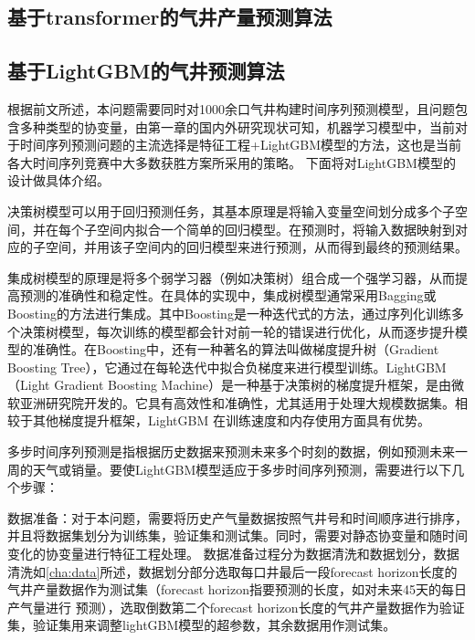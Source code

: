 \subsection{基于transformer的气井产量预测算法}
\subsection{基于LightGBM的气井预测算法}
根据前文所述，本问题需要同时对1000余口气井构建时间序列预测模型，且问题包含多种类型的协变量，由第一章的国内外研究现状可知，机器学习模型中，当前对于时间序列预测问题的主流选择是特征工程+LightGBM模型的方法，这也是当前各大时间序列竞赛中大多数获胜方案所采用的策略。
下面将对LightGBM模型的设计做具体介绍。

决策树模型可以用于回归预测任务，其基本原理是将输入变量空间划分成多个子空间，并在每个子空间内拟合一个简单的回归模型。在预测时，将输入数据映射到对应的子空间，并用该子空间内的回归模型来进行预测，从而得到最终的预测结果。

集成树模型的原理是将多个弱学习器（例如决策树）组合成一个强学习器，从而提高预测的准确性和稳定性。在具体的实现中，集成树模型通常采用Bagging或Boosting的方法进行集成。其中Boosting是一种迭代式的方法，通过序列化训练多个决策树模型，每次训练的模型都会针对前一轮的错误进行优化，从而逐步提升模型的准确性。在Boosting中，还有一种著名的算法叫做梯度提升树（Gradient Boosting Tree），它通过在每轮迭代中拟合负梯度来进行模型训练。LightGBM（Light Gradient Boosting Machine）是一种基于决策树的梯度提升框架，是由微软亚洲研究院开发的。它具有高效性和准确性，尤其适用于处理大规模数据集。相较于其他梯度提升框架，LightGBM 在训练速度和内存使用方面具有优势。

多步时间序列预测是指根据历史数据来预测未来多个时刻的数据，例如预测未来一周的天气或销量。要使LightGBM模型适应于多步时间序列预测，需要进行以下几个步骤：

数据准备：对于本问题，需要将历史产气量数据按照气井号和时间顺序进行排序，并且将数据集划分为训练集，验证集和测试集。同时，需要对静态协变量和随时间变化的协变量进行特征工程处理。
数据准备过程分为数据清洗和数据划分，数据清洗如\ref{cha:data}所述，数据划分部分选取每口井最后一段forecast horizon长度的气井产量数据作为测试集（forecast horizon指要预测的长度，如对未来45天的每日产气量进行
预测），选取倒数第二个forecast horizon长度的气井产量数据作为验证集，验证集用来调整lightGBM模型的超参数，其余数据用作测试集。

